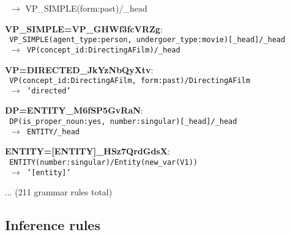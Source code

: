 \documentclass[letterpaper]{article}
\begin{document}
{\begin{flushleft}
\begin{flushleft}
{~$\rightarrow$ VP\_SIMPLE(form:past)/\_head
}
\end{flushleft}
\begin{flushleft}
\noindent \textbf{VP\_SIMPLE=VP\_GHWf3fcVRZg}: \\
\texttt{
VP\_SIMPLE(agent\_type:person, undergoer\_type:movie)[\_head]/\_head \\
~$\rightarrow$ VP(concept\_id:DirectingAFilm)/\_head
}
\end{flushleft}
\begin{flushleft}
\noindent \textbf{VP=DIRECTED\_JkYzNbQyXtv}: \\
\texttt{
VP(concept\_id:DirectingAFilm, form:past)/DirectingAFilm \\
~$\rightarrow$ 'directed'
}
\end{flushleft}
\begin{flushleft}
\noindent \textbf{DP=ENTITY\_M6fSP5GvRaN}: \\
\texttt{
DP(is\_proper\_noun:yes, number:singular)[\_head]/\_head \\
~$\rightarrow$ ENTITY/\_head
}
\end{flushleft}
\begin{flushleft}
\noindent \textbf{ENTITY=[ENTITY]\_HSz7QrdGdsX}: \\
\texttt{
ENTITY(number:singular)/Entity(new\_var(V1)) \\
~$\rightarrow$ '[entity]'
}
\end{flushleft}
\end{flushleft}
}

... (211 grammar rules total)

\subsection{Inference rules}
\end{document}
